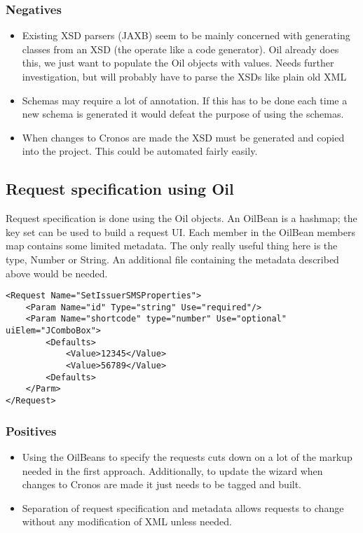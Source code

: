 \documentclass[a4paper, 11pt, titlepage]{article}
\begin{document}
		\subsubsection{Negatives}
		\begin{itemize}
		\item Existing XSD parsers (JAXB) seem to be mainly concerned with generating classes from an XSD (the operate like a code generator). Oil already does this, we just want to populate the Oil objects with values. Needs further investigation, but will probably have to parse the XSDs like plain old XML
		\item Schemas may require a lot of annotation. If this has to be done each time a new schema is generated it would defeat the purpose of using the schemas.
		\item When changes to Cronos are made the XSD must be generated and copied into the project. This could be automated fairly easily.
		\end{itemize}
	\subsection{Request specification using Oil}
Request specification is done using the Oil objects. An OilBean is a hashmap; the key set can be used to build a request UI. Each member in the OilBean members map contains some limited metadata. The only really useful thing here is the type, Number or String. An additional file containing the metadata described above would be needed.
	\begin{verbatim}
<Request Name="SetIssuerSMSProperties">
    <Param Name="id" Type="string" Use="required"/>
    <Param Name="shortcode" type="number" Use="optional" uiElem="JComboBox">
        <Defaults>
            <Value>12345</Value>
            <Value>56789</Value>
        <Defaults>
    </Parm>
</Request>

	\end{verbatim}

		\subsubsection{Positives}
		\begin{itemize}
		\item Using the OilBeans to specify the requests cuts down on a lot of the markup needed in the first approach. Additionally, to update the wizard when changes to Cronos are made it just needs to be tagged and built.
		\item Separation of request specification and metadata allows requests to change without any modification of XML unless needed.
		\end{itemize}
\end{document}
